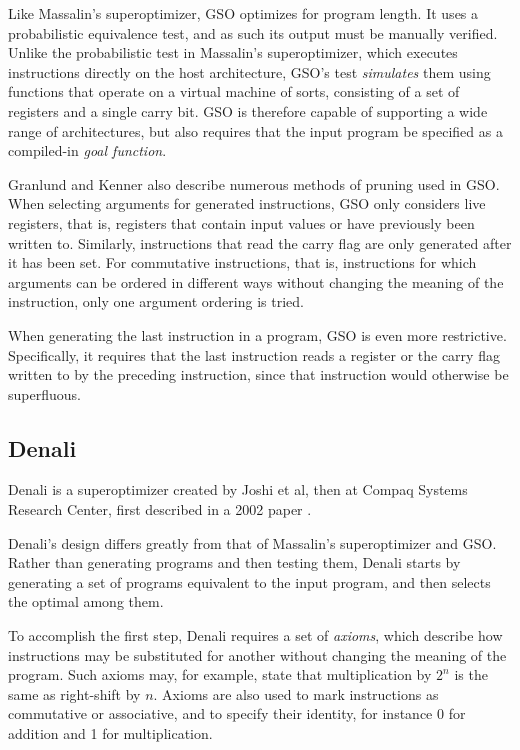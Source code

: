 \documentclass[a4paper,11pt]{kth-mag}
\begin{document}
Like Massalin's superoptimizer, GSO optimizes for program length.
It uses a probabilistic equivalence test, and as such its output must be manually verified.
Unlike the probabilistic test in Massalin's superoptimizer, which executes instructions directly on the host architecture, GSO's test \emph{simulates} them using functions that operate on a virtual machine of sorts, consisting of a set of registers and a single carry bit.
GSO is therefore capable of supporting a wide range of architectures, but also requires that the input program be specified as a compiled-in \emph{goal function}.

Granlund and Kenner also describe numerous methods of pruning used in GSO.
When selecting arguments for generated instructions, GSO only considers live registers, that is, registers that contain input values or have previously been written to.
Similarly, instructions that read the carry flag are only generated after it has been set.
For commutative instructions, that is, instructions for which arguments can be ordered in different ways without changing the meaning of the instruction, only one argument ordering is tried.

When generating the last instruction in a program, GSO is even more restrictive.
Specifically, it requires that the last instruction reads a register or the carry flag written to by the preceding instruction, since that instruction would otherwise be superfluous.

\subsection{Denali}

Denali is a superoptimizer created by Joshi et al, then at Compaq Systems Research Center, first described in a 2002 paper \cite{joshi02}.

Denali's design differs greatly from that of Massalin's superoptimizer and GSO.
Rather than generating programs and then testing them, Denali starts by generating a set of programs equivalent to the input program, and then selects the optimal among them.

To accomplish the first step, Denali requires a set of \emph{axioms}, which describe how instructions may be substituted for another without changing the meaning of the program.
Such axioms may, for example, state that multiplication by $2^n$ is the same as right-shift by $n$.
Axioms are also used to mark instructions as commutative or associative, and to specify their identity, for instance 0 for addition and 1 for multiplication.
\end{document}

